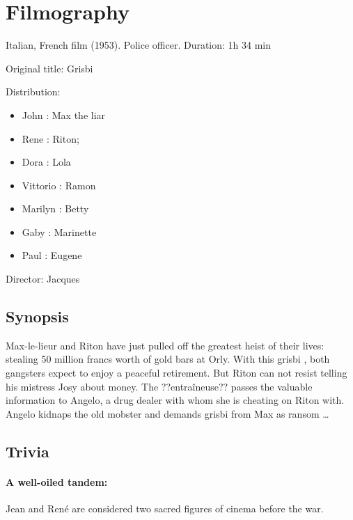 \section*{Filmography}


Italian, French film (1953). Police officer. Duration: 1h 34 min

Original title: Grisbi

Distribution:

\begin{itemize}
    \item John : Max the liar
    \item Rene : Riton;
    \item Dora : Lola
    \item Vittorio : Ramon
    \item Marilyn : Betty
    \item Gaby : Marinette
    \item Paul : Eugene
\end{itemize}

Director: Jacques 

\subsection*{Synopsis}

Max-le-lieur and Riton have just pulled off the greatest heist of their lives: stealing 50
million francs worth of gold bars at Orly. With this \og grisbi \fg{}, both
gangsters expect to enjoy a peaceful retirement. But Riton can not
resist telling his mistress Josy about money. The ??entraîneuse?? passes the
valuable information to Angelo, a drug dealer with whom she is cheating on Riton with. Angelo kidnaps the old mobster and demands \og grisbi \fg{} from Max as ransom \dots

\subsection*{Trivia} 

\paragraph{A well-oiled tandem:} Jean  and René
 are considered two sacred figures of cinema 
before the war.
